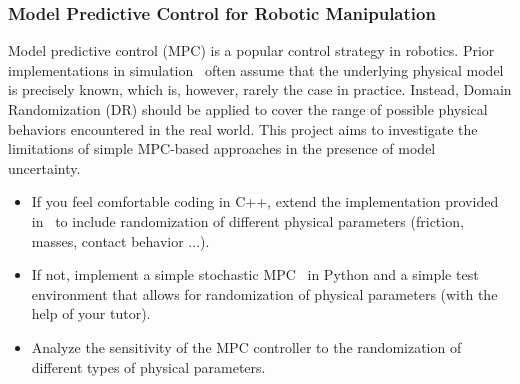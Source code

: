 \documentclass[a4paper]{article}
\begin{document}


\subsubsection{Model Predictive Control for Robotic Manipulation}

Model predictive control (MPC) is a popular control strategy in robotics. 
Prior implementations in simulation~\cite{MujocoMPC} often assume that the underlying physical model is precisely known, 
which is, however, rarely the case in practice. 
Instead, Domain Randomization (DR) should be applied to cover the range of possible physical behaviors encountered in the real world.
This project aims to investigate the limitations of simple MPC-based approaches in the presence of model uncertainty.

\begin{itemize}
  \item If you feel comfortable coding in C++, extend the implementation provided in~\cite{MujocoMPC} to include randomization of different physical parameters (friction, masses, contact behavior ...).
  \item If not, implement a simple stochastic MPC~\cite{Howell2022-uj} in Python and a simple test environment that allows for randomization of physical parameters (with the help of your tutor).
  \item Analyze the sensitivity of the MPC controller to the randomization of different types of physical parameters. 
\end{itemize} 

\end{document}
